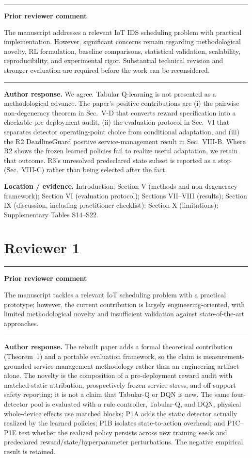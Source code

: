 \documentclass[11pt]{article}
\newenvironment{qbox}
    {\par\vspace{4pt}\noindent\begin{minipage}{\linewidth}\rule{\linewidth}{0.4pt}\par\noindent\textbf{Prior reviewer comment}\par\noindent}
    {\par\rule{\linewidth}{0.4pt}\end{minipage}\par\vspace{4pt}}
\begin{document}
\begin{qbox}
The manuscript addresses a relevant IoT IDS scheduling problem with practical implementation. However, significant concerns remain regarding methodological novelty, RL formulation, baseline comparisons, statistical validation, scalability, reproducibility, and experimental rigor. Substantial technical revision and stronger evaluation are required before the work can be reconsidered.
\end{qbox}

\textbf{Author response.} We agree. Tabular Q-learning is not presented as a methodological advance. The paper's positive contributions are (i) the pairwise non-degeneracy theorem in Sec.~V-D that converts reward specification into a checkable pre-deployment audit, (ii) the evaluation protocol in Sec.~VI that separates detector operating-point choice from conditional adaptation, and (iii) the R2 DeadlineGuard positive service-management result in Sec.~VIII-B. Where R2 shows the frozen learned policies fail to realize useful adaptation, we retain that outcome. R3's unresolved predeclared state subset is reported as a stop (Sec.~VIII-C) rather than being selected after the fact.

\textbf{Location / evidence.} Introduction; Section V (methods and non-degeneracy framework); Section VI (evaluation protocol); Sections VII--VIII (results); Section IX (discussion, including practitioner checklist); Section X (limitations); Supplementary Tables S14--S22.

\section*{Reviewer 1}

\begin{qbox}
The manuscript tackles a relevant IoT scheduling problem with a practical prototype; however, the current contribution is largely engineering-oriented, with limited methodological novelty and insufficient validation against state-of-the-art approaches.
\end{qbox}

\textbf{Author response.} The rebuilt paper adds a formal theoretical contribution (Theorem~1) and a portable evaluation framework, so the claim is measurement-grounded service-management methodology rather than an engineering artifact alone. The novelty is the composition of a pre-deployment reward audit with matched-static attribution, prospectively frozen service stress, and off-support safety reporting; it is not a claim that Tabular-Q or DQN is new. The same four-detector pool is evaluated with a rule controller, Tabular-Q, and DQN; physical whole-device effects use matched blocks; P1A adds the static detector actually realized by the learned policies; P1B isolates state-to-action overhead; and P1C--P1E test whether the realized policy persists across new training seeds and predeclared reward/state/hyperparameter perturbations. The negative empirical result is retained.
\end{document}

